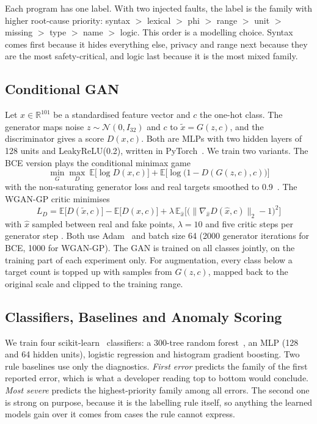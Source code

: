 Each program has one label. With two injected faults, the label is the family with higher root-cause priority:
syntax $>$ lexical $>$ phi $>$ range $>$ unit $>$ missing $>$ type $>$ name $>$ logic. This order is a modelling choice.
Syntax comes first because it hides everything else, privacy and range next because they are the most safety-critical,
and logic last because it is the most mixed family.

\subsection{Conditional GAN}

Let $x\in\mathbb{R}^{101}$ be a standardised feature vector and $c$ the one-hot class. The generator maps noise
$z\sim\mathcal{N}(0,I_{32})$ and $c$ to $\tilde{x}=G(z,c)$, and the discriminator gives a score $D(x,c)$. Both are MLPs
with two hidden layers of 128 units and LeakyReLU(0.2), written in PyTorch~\cite{paszke2019}. We train two variants. The
BCE version plays the conditional minimax game
\begin{equation}
\min_G\max_D\ \mathbb{E}\big[\log D(x,c)\big]+\mathbb{E}\big[\log\big(1-D(G(z,c),c)\big)\big]
\end{equation}
with the non-saturating generator loss and real targets smoothed to 0.9~\cite{salimans2016}. The WGAN-GP critic
minimises
\begin{equation}
L_D=\mathbb{E}\big[D(\tilde{x},c)\big]-\mathbb{E}\big[D(x,c)\big]+\lambda\,\mathbb{E}_{\hat{x}}\Big[\big(\lVert\nabla_{\hat{x}}D(\hat{x},c)\rVert_2-1\big)^2\Big]
\end{equation}
with $\hat{x}$ sampled between real and fake points, $\lambda=10$ and five critic steps per generator step
\cite{gulrajani2017}. Both use Adam~\cite{kingma2015} and batch size 64 (2000 generator iterations for BCE, 1000 for
WGAN-GP). The GAN is trained on all classes jointly, on the training part of each experiment only. For augmentation,
every class below a target count is topped up with samples from $G(z,c)$, mapped back to the original scale and clipped
to the training range.

\subsection{Classifiers, Baselines and Anomaly Scoring}

We train four scikit-learn~\cite{pedregosa2011} classifiers: a 300-tree random forest~\cite{breiman2001}, an MLP (128
and 64 hidden units), logistic regression and histogram gradient boosting. Two rule baselines use only the diagnostics.
\emph{First error} predicts the family of the first reported error, which is what a developer reading top to bottom
would conclude. \emph{Most severe} predicts the highest-priority family among all errors. The second one is strong on
purpose, because it is the labelling rule itself, so anything the learned models gain over it comes from cases the rule
cannot express.

